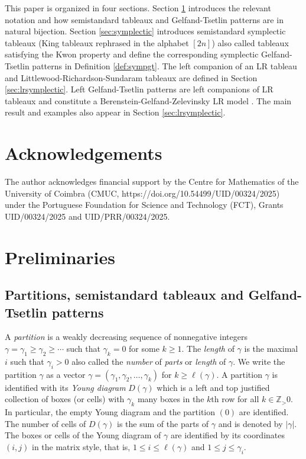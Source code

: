 \documentclass[reqno]{amsart}
\theoremstyle{tplain}
\begin{document}
{This paper is organized in four sections. Section \ref{sec:preliminaries0} introduces the relevant notation and how semistandard tableaux and Gelfand-Tsetlin patterns are in natural bijection.  Section \ref{sec:symplectic} introduces semistandard symplectic tableaux (King tableaux rephrased in the alphabet $[2n]$) \cite{watanabe} also called tableaux satisfying the Kwon property \cite{sathishtorres} and define the corresponding symplectic Gelfand-Tsetlin patterns in Definition \ref{def:sympgt}. The left companion of an LR tableau and Littlewood-Richardson-Sundaram tableaux are defined in Section \ref{sec:lrsymplectic}. Left Gelfand-Tsetlin patterns are left companions of LR tableaux and constitute a Berenstein-Gelfand-Zelevinsky LR model \cite{BZphy}. The main result and examples also appear in Section \ref{sec:lrsymplectic}.



\section*{Acknowledgements}
The author acknowledges financial support by the Centre for Mathematics of the University of Coimbra (CMUC, https://doi.org/10.54499/UID/00324/2025) under the Portuguese Foundation for Science and Technology (FCT), Grants UID/00324/2025 and UID/PRR/00324/2025.

\section{Preliminaries}\label{sec:preliminaries0}

\subsection{Partitions,  semistandard tableaux and Gelfand-Tsetlin patterns}\label{sec:preliminaries}
A \emph{partition} is a weakly decreasing sequence of nonnegative integers $\gamma = \gamma_1\ge \gamma_2 \ge \cdots$
such that $\gamma_k =0$ for some $k \ge1$. The \emph{length} of $\gamma$ is the maximal $i$ such that $\gamma_i> 0$ also called the \emph{number}
of \emph{parts} or \emph{length} of $\gamma$.  We write the partition $\gamma$ as a vector
 $\gamma = (\gamma_1, \gamma_2, \dots,\gamma_k)$ for $k \ge  \ell(\gamma)$. A partition $\gamma$ is identified
with its \emph{Young diagram} $D(\gamma)$ which is a left and top justified collection of boxes (or cells)
with $\gamma_k$ many boxes in the $k$th row for all $k \in \mathbb{Z}_> 0$. In particular, the empty Young diagram and  the  partition $(0)$ are identified. The number of cells of $D(\gamma)$ is  the sum of the parts of $\gamma$ and is denoted by $|\gamma|$.
The boxes or cells of the Young diagram of $\gamma$ are identified by its  coordinates $(i,j)$ in the matrix style, that is, $1\le i\le \ell(\gamma)$ and $1\le j\le \gamma_i$.

}
\end{document}
